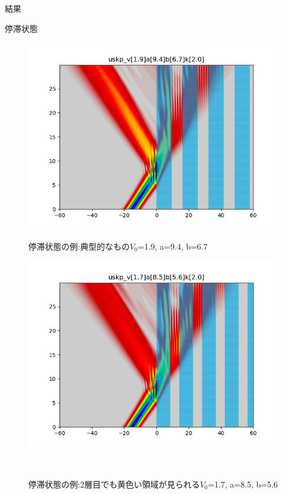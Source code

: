 \documentclass[a4paper, lualatex]{bxjsarticle}
\begin{document}
\begin{section}{結果}
    \begin{subsection}{停滞状態\label{teitais}}
        \begin{figure}[h]
            \begin{minipage}{0.5\hsize}
                \centering
                \includegraphics[width=0.9\hsize]{teitai1.png}
                \caption{停滞状態の例:典型的なもの$V_0$=1.9, a=9.4, b=6.7}
                \label{teitai1}
            \end{minipage}
            \begin{minipage}{0.5\hsize}
                \centering
                \includegraphics[width=0.9\hsize]{teitai2.png}
                \caption{停滞状態の例:2層目でも黄色い領域が見られる$V_0$=1.7, a=8.5, b=5.6}
                \label{teitai2}
            \end{minipage}\\
            \begin{minipage}{0.5\hsize}

\end{minipage}
\end{figure}
\end{subsection}
\end{section}
\end{document}
